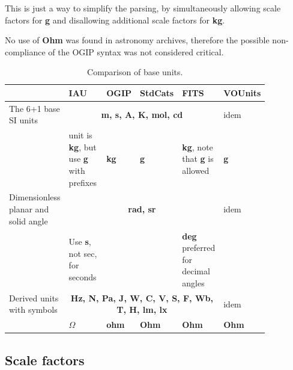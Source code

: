 \documentclass[12pt,notitlepage,onecolumn]{ivoa}
\newcommand{\unit}[1]{\textbf{\textsf{\color{orange}#1}}}
\begin{document}
This is just a way to simplify the parsing, by simultaneously allowing scale factors for \unit{g} and
disallowing additional scale factors for \unit{kg}.

No use of \unit{Ohm} was found in astronomy archives, therefore the possible non-compliance of the OGIP
syntax was not considered critical.
\begin{table}
\begin{tabular}{|p{0.2\linewidth}|p{0.15\linewidth}|p{0.12\linewidth}|p{0.12\linewidth}|p{0.12\linewidth}|p{0.15\linewidth}|}
\hline
    & IAU & OGIP  & StdCats & FITS  & VOUnits\\\hline
    The 6+1 base SI units\raggedright & \multicolumn{4}{c|}{\unit{m, s, A, K, mol, cd}} & idem \\
     & unit is \unit{kg}, but use \unit{g} with prefixes\raggedright & \unit{kg} & \unit{g} & \unit{kg}, note that \unit{g} is allowed & \unit{g}\\
     \hline
    Dimensionless planar and solid angle\raggedright & \multicolumn{4}{c|}{\unit{rad, sr}} & idem \\
    & Use \unit{s}, not sec, for seconds\raggedright &  &  & \unit{deg} preferred for decimal angles & \\\hline
    Derived units with symbols\raggedright & \multicolumn{4}{c|}{\unit{Hz, N, Pa,
      J, W, C, V, S, F, Wb, T, H, lm, lx}} & idem \\
     & \unit{$\Omega$} & \unit{ohm} & \unit{Ohm} & \unit{Ohm} & \unit{Ohm}\\\hline
\end{tabular}
  \caption{Comparison of base units.}
  \label{tab:comparUnitBase}
\end{table}

\subsection{Scale factors\label{sec:scaleFactors}}
\end{document}

